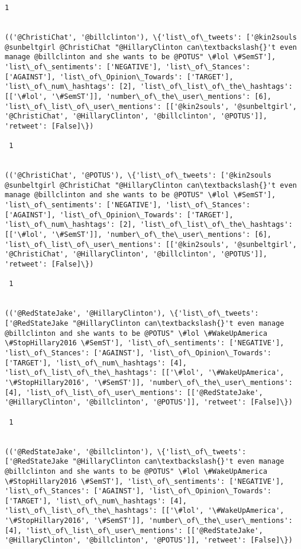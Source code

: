 \documentclass[11pt]{article}
\begin{document}
\begin{Verbatim}[commandchars=\\\{\}]
 1
 

(('@ChristiChat', '@billclinton'), \{'list\_of\_tweets': ['@kin2souls @sunbeltgirl @ChristiChat "@HillaryClinton can\textbackslash{}'t even manage @billclinton and she wants to be @POTUS" \#lol \#SemST'], 'list\_of\_sentiments': ['NEGATIVE'], 'list\_of\_Stances': ['AGAINST'], 'list\_of\_Opinion\_Towards': ['TARGET'], 'list\_of\_num\_hashtags': [2], 'list\_of\_list\_of\_the\_hashtags': [['\#lol', '\#SemST']], 'number\_of\_the\_user\_mentions': [6], 'list\_of\_list\_of\_user\_mentions': [['@kin2souls', '@sunbeltgirl', '@ChristiChat', '@HillaryClinton', '@billclinton', '@POTUS']], 'retweet': [False]\})

 1
 

(('@ChristiChat', '@POTUS'), \{'list\_of\_tweets': ['@kin2souls @sunbeltgirl @ChristiChat "@HillaryClinton can\textbackslash{}'t even manage @billclinton and she wants to be @POTUS" \#lol \#SemST'], 'list\_of\_sentiments': ['NEGATIVE'], 'list\_of\_Stances': ['AGAINST'], 'list\_of\_Opinion\_Towards': ['TARGET'], 'list\_of\_num\_hashtags': [2], 'list\_of\_list\_of\_the\_hashtags': [['\#lol', '\#SemST']], 'number\_of\_the\_user\_mentions': [6], 'list\_of\_list\_of\_user\_mentions': [['@kin2souls', '@sunbeltgirl', '@ChristiChat', '@HillaryClinton', '@billclinton', '@POTUS']], 'retweet': [False]\})

 1
 

(('@RedStateJake', '@HillaryClinton'), \{'list\_of\_tweets': ['@RedStateJake "@HillaryClinton can\textbackslash{}'t even manage @billclinton and she wants to be @POTUS" \#lol \#WakeUpAmerica \#StopHillary2016 \#SemST'], 'list\_of\_sentiments': ['NEGATIVE'], 'list\_of\_Stances': ['AGAINST'], 'list\_of\_Opinion\_Towards': ['TARGET'], 'list\_of\_num\_hashtags': [4], 'list\_of\_list\_of\_the\_hashtags': [['\#lol', '\#WakeUpAmerica', '\#StopHillary2016', '\#SemST']], 'number\_of\_the\_user\_mentions': [4], 'list\_of\_list\_of\_user\_mentions': [['@RedStateJake', '@HillaryClinton', '@billclinton', '@POTUS']], 'retweet': [False]\})

 1
 

(('@RedStateJake', '@billclinton'), \{'list\_of\_tweets': ['@RedStateJake "@HillaryClinton can\textbackslash{}'t even manage @billclinton and she wants to be @POTUS" \#lol \#WakeUpAmerica \#StopHillary2016 \#SemST'], 'list\_of\_sentiments': ['NEGATIVE'], 'list\_of\_Stances': ['AGAINST'], 'list\_of\_Opinion\_Towards': ['TARGET'], 'list\_of\_num\_hashtags': [4], 'list\_of\_list\_of\_the\_hashtags': [['\#lol', '\#WakeUpAmerica', '\#StopHillary2016', '\#SemST']], 'number\_of\_the\_user\_mentions': [4], 'list\_of\_list\_of\_user\_mentions': [['@RedStateJake', '@HillaryClinton', '@billclinton', '@POTUS']], 'retweet': [False]\})


\end{Verbatim}
\end{document}
